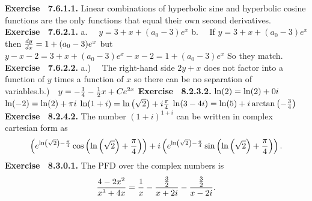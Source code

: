  {\noindent \protect \bf  Exercise ~7.6.1.1.} Linear combinations of hyperbolic sine and hyperbolic cosine functions are the only functions that equal their own second derivatives.  \protect \newline  \protect \newline  
 {\noindent \protect \bf  Exercise ~7.6.2.1.} a.~~ $y=3 +x + (a_0-3)e^x$ b.~~ If $y =3 +x + (a_0-3)e^x$ then $\protect \frac  {dy}{dx} = 1 +(a_0-3)e^x$ but $y-x-2 = 3+x+(a_0-3)e^x -x-2 = 1 + (a_0-3)e^x$ So they match.  \protect \newline  \protect \newline  
 {\noindent \protect \bf  Exercise ~7.6.2.2.} a.)~~ The right-hand side $2y+x$ does not factor into a function of $y$ times a function of $x$ so there can be no separation of variables.\protect \newline  b.)~~$y = -\protect \frac  {1}{4} -\protect \frac  {1}{2}x +Ce^{2x}$ \protect \newline   \protect \newline  \protect \newline  
 {\noindent \protect \bf  Exercise ~8.2.3.2.} \textbullet $\protect \qopname  \relax o{ln}(2)=\protect \qopname  \relax o{ln}(2)+0i$ \textbullet $\protect \qopname  \relax o{ln}(-2)=\protect \qopname  \relax o{ln}(2)+\pi i$ \textbullet $\protect \qopname  \relax o{ln}(1+i)=\protect \qopname  \relax o{ln}\left (\protect \sqrt  {2}\right )+i\protect \frac  {\pi }{4}$ \textbullet $\protect \qopname  \relax o{ln}(3-4i)=\protect \qopname  \relax o{ln}(5)+i\protect \qopname  \relax o{arctan}\left (-\protect \frac  {3}{4}\right )$ \protect \newline  \protect \newline  
 {\noindent \protect \bf  Exercise ~8.2.4.2.} The number $(1+i)^{1+i}$ can be written in complex cartesian form as $$\left (e^{\protect \qopname  \relax o{ln}\left (\protect \sqrt  {2}\right )-\protect \frac  {\pi }{4}}\protect \qopname  \relax o{cos}\left (\protect \qopname  \relax o{ln}\left (\protect \sqrt  {2}\right )+\protect \frac  {\pi }{4} \right )\right )+i\left (e^{\protect \qopname  \relax o{ln}\left (\protect \sqrt  {2}\right )-\protect \frac  {\pi }{4}}\protect \qopname  \relax o{sin}\left (\protect \qopname  \relax o{ln}\left (\protect \sqrt  {2}\right )+\protect \frac  {\pi }{4} \right )\right ). $$ \protect \newline  \protect \newline  
 {\noindent \protect \bf  Exercise ~8.3.0.1.} The PFD over the complex numbers is $$\protect \frac  {4-2x^2}{x^3+4x}=\protect \frac  {1}{x}-\protect \frac  {\protect \frac  {3}{2}}{x+2i}-\protect \frac  {\protect \frac  {3}{2}}{x-2i}. $$ \protect \newline  \protect \newline  
